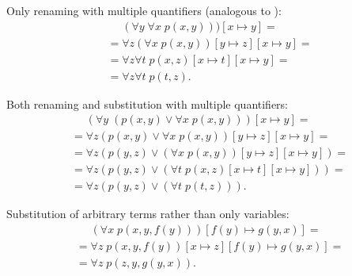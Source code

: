 \begin{example}
\begin{ExEnum}
     Only renaming with multiple quantifiers (analogous to ):
    \begin{align*}
      &\phantom{{}={}}
      (\forall y\; \forall x\; p(x, y)))[x \mapsto y]
      = \\ &=
      \forall z (\forall x\; p(x, y))[y \mapsto z][x \mapsto y]
      = \\ &=
      \forall z \forall t\; p(x, z)[x \mapsto t][x \mapsto y]
      = \\ &=
      \forall z \forall t\; p(t, z).
    \end{align*}

     Both renaming and substitution with multiple quantifiers:
    \begin{align*}
      &\phantom{{}={}}
      (\forall y\; (p(x, y) \vee \forall x\; p(x, y)))[x \mapsto y]
      = \\ &=
      \forall z (p(x, y) \vee \forall x\; p(x, y))[y \mapsto z][x \mapsto y]
      = \\ &=
      \forall z (p(y, z) \vee (\forall x\; p(x, y))[y \mapsto z][x \mapsto y])
      = \\ &=
      \forall z (p(y, z) \vee (\forall t\; p(x, z)[x \mapsto t][x \mapsto y]))
      = \\ &=
      \forall z (p(y, z) \vee (\forall t\; p(t, z))).
    \end{align*}

     Substitution of arbitrary terms rather than only variables:
    \begin{align*}
      &\phantom{{}={}}
      (\forall x\; p(x, y, f(y)))[f(y) \mapsto g(y, x)]
      = \\ &=
      \forall z\; p(x, y, f(y))[x \mapsto z][f(y) \mapsto g(y, x)]
      = \\ &=
      \forall z\; p(z, y, g(y, x)).
    \end{align*}
  \end{ExEnum}
\end{example}
